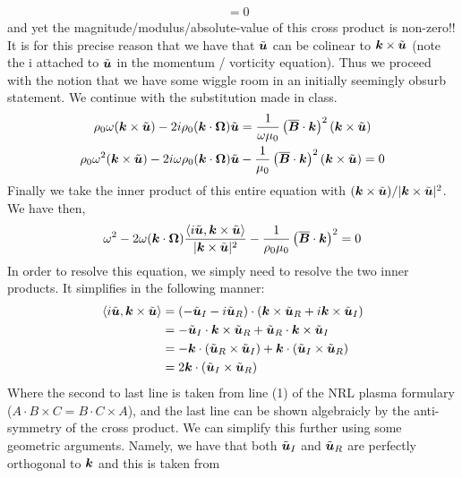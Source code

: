\documentclass{article}
\begin{document}
\begin{enumerate}[label=\alph*.)]
\begin{align*}
        &= 0
    \end{align*}
    and yet the magnitude/modulus/absolute-value of this cross product is
    non-zero!! It is for this precise reason that we have that $\tilde{\boldsymbol{u}}$
    can be colinear to $\boldsymbol{k}\times\tilde{\boldsymbol{u}}$ (note the i attached to
    $\tilde{\boldsymbol{u}}$ in the momentum / vorticity equation). Thus we proceed with
    the notion that we have some wiggle room in an initially seemingly obsurb
    statement. We continue with the substitution made in class. 
    \begin{gather*}
        \rho_0\omega(\boldsymbol{k}\times\tilde{\boldsymbol{u}}) -
        2i\rho_0(\boldsymbol{k}\cdot\boldsymbol{\Omega})\tilde{\boldsymbol{u}} =
        \frac{1}{\omega\mu_0}\left(\overline{\boldsymbol{B}}\cdot\boldsymbol{k}\right)^2(\boldsymbol{k}\times\tilde{\boldsymbol{u}})\\
        \rho_0\omega^2(\boldsymbol{k}\times\tilde{\boldsymbol{u}}) -
        2i\omega\rho_0(\boldsymbol{k}\cdot\boldsymbol{\Omega})\tilde{\boldsymbol{u}} -
        \frac{1}{\mu_0}\left(\overline{\boldsymbol{B}}\cdot\boldsymbol{k}\right)^2(\boldsymbol{k}\times\tilde{\boldsymbol{u}})
        = 0
    \end{gather*}
    Finally we take the inner product of this entire equation with
    $(\boldsymbol{k}\times\tilde{\boldsymbol{u}})/|\boldsymbol{k}\times\tilde{\boldsymbol{u}}|^2$. We have then, 
    \begin{gather*}
        \omega^2 -
        2\omega(\boldsymbol{k}\cdot\boldsymbol{\Omega})\frac{\left<i\tilde{\boldsymbol{u}},
        \boldsymbol{k}\times\tilde{\boldsymbol{u}}\right>}{|\boldsymbol{k}\times\tilde{\boldsymbol{u}}|^2} -
        \frac{1}{\rho_0\mu_0}\left(\overline{\boldsymbol{B}}\cdot\boldsymbol{k}\right)^2
        = 0
    \end{gather*}
    In order to resolve this equation, we simply need to resolve the two inner
    products. It simplifies in the following manner: 
    \begin{align*}
        \left<i\tilde{\boldsymbol{u}}, \boldsymbol{k}\times\tilde{\boldsymbol{u}}\right> &= \left(-\tilde{\boldsymbol{u}}_I -
        i\tilde{\boldsymbol{u}}_R\right)\cdot\left(\boldsymbol{k}\times\tilde{\boldsymbol{u}}_R + i\boldsymbol{k}\times\tilde{\boldsymbol{u}}_I\right)\\
        &= -\tilde{\boldsymbol{u}}_I\cdot\boldsymbol{k}\times\tilde{\boldsymbol{u}}_R + \tilde{\boldsymbol{u}}_R\cdot\boldsymbol{k}\times\tilde{\boldsymbol{u}}_I\\
        &= -\boldsymbol{k}\cdot(\tilde{\boldsymbol{u}}_R\times\tilde{\boldsymbol{u}}_I) + \boldsymbol{k}\cdot(\tilde{\boldsymbol{u}}_I\times\tilde{\boldsymbol{u}}_R)\\
        &= 2\boldsymbol{k}\cdot(\tilde{\boldsymbol{u}}_I\times\tilde{\boldsymbol{u}}_R)
    \end{align*}
    Where the second to last line is taken from line (1) of the NRL plasma
    formulary ($A\cdot B\times C = B\cdot C\times A$), and the last line can be
    shown algebraicly by the anti-symmetry of the cross product. We can simplify
    this further using some geometric arguments. Namely, we have that both
    $\tilde{\boldsymbol{u}}_I$ and $\tilde{\boldsymbol{u}}_R$ are perfectly orthogonal to $\boldsymbol{k}$ and this is taken from

\end{enumerate}
\end{document}
